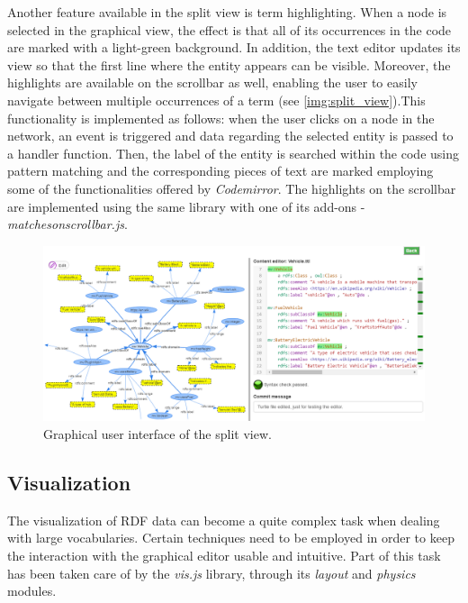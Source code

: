 Another feature available in the split view is term highlighting. When a node is selected in the graphical view, the effect is that all of its occurrences in the code are marked with a light-green background. In addition, the text editor updates its view so that the first line where the entity appears can be visible. Moreover, the highlights are available on the scrollbar as well, enabling the user to easily navigate between multiple occurrences of a term (see \autoref{img:split_view}).This functionality is implemented as follows: when the user clicks on a node in the network, an event is triggered and data regarding the selected entity is passed to a handler function. Then, the label of the entity is searched within the code using pattern matching and the corresponding pieces of text are marked employing some of the functionalities offered by \textit{Codemirror}. The highlights on the scrollbar are implemented using the same library with one of its add-ons - \textit{matchesonscrollbar.js}.

\begin{landscape}
\begin{figure}[ht]
\centering
    \includegraphics[width = 20cm]{img/split_view.png}
    \vspace{1.2cm}
    \caption{Graphical user interface of the split view.}
    \label{img:split_view}
\end{figure}
\end{landscape}


\subsection {Visualization}
\label{subsec:visualization}

The visualization of RDF data can become a quite complex task when dealing with large vocabularies. Certain techniques need to be employed in order to keep the interaction with the graphical editor usable and intuitive. Part of this task has been taken care of by the \textit{vis.js} library, through its \textit{layout} and \textit{physics} modules.

